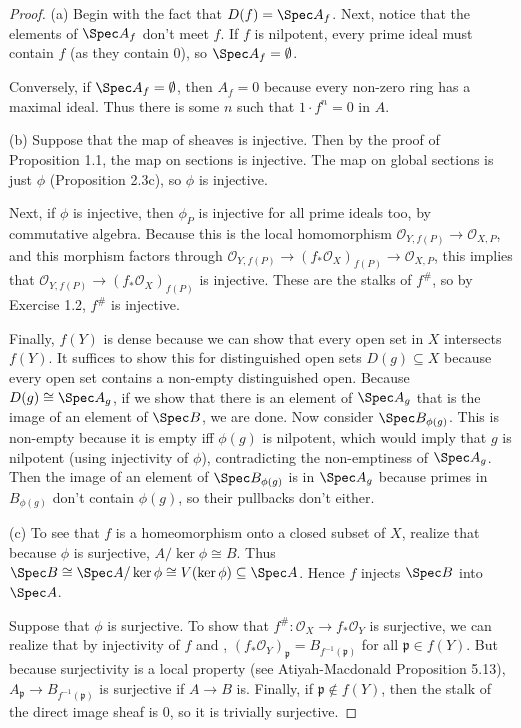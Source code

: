 \begin{proof}
	(a) Begin with the fact that $D(f) = \Spec A_f $.
	Next, notice that the elements of $\Spec A_f $ don't meet $f $.
	If $f $ is nilpotent, every prime ideal must contain $f $ (as they contain $0 $), so $\Spec A_f = \emptyset $.

	Conversely, if $\Spec A_f = \emptyset $, then $A_f = 0$ because every non-zero ring has a maximal ideal.
	Thus there is some $n $ such that $1\cdot f^n = 0 $ in $A $.

	(b) Suppose that the map of sheaves is injective.
	Then by the proof of Proposition 1.1, the map on sections is injective.
	The map on global sections is just $\phi  $ (Proposition 2.3c), so $\phi  $ is injective.

	Next, if $\phi  $ is injective, then $\phi _P $ is injective for all prime ideals too, by commutative algebra.
	Because this is the local homomorphism $\mathcal{O}_{Y,f(P)} \to \mathcal{O}_{X,P} $, and this morphism factors through $\mathcal{O}_{Y,f(P)} \to (f_\ast \mathcal{O}_{X})_{f(P)} \to \mathcal{O}_{X,P}$, this implies that $\mathcal{O}_{Y,f(P)}\to (f_\ast \mathcal{O}_X)_{f(P)} $ is injective.
	These are the stalks of $f^\# $, so by Exercise 1.2, $f^\#$ is injective.

	Finally, $f(Y) $ is dense because we can show that every open set in $X $ intersects $f(Y) $.
	It suffices to show this for distinguished open sets $D(g) \subseteq X $ because every open set contains a non-empty distinguished open.
	Because $D(g) \cong \Spec A_g $, if we show that there is an element of $\Spec A_g $ that is the image of an element of $\Spec B $, we are done.
	Now consider $\Spec B_{\phi (g)} $.
	This is non-empty because it is empty iff $\phi (g) $ is nilpotent, which would imply that $g $ is nilpotent (using injectivity of $\phi  $), contradicting the non-emptiness of $\Spec A_g $.
	Then the image of an element of $\Spec B_{\phi (g)} $ is in $\Spec A_g $ because primes in $B_{\phi (g)} $ don't contain $\phi (g) $, so their pullbacks don't either.

	(c) 
	To see that $f $ is a homeomorphism onto a closed subset of $X $, realize that because $\phi  $ is surjective, $A / \ker \phi \cong B $.
	Thus $\Spec B \cong \Spec A / \ker \phi \cong V(\ker \phi) \subseteq \Spec A$.
	Hence $f $ injects $\Spec B $ into $\Spec A $.

	Suppose that $\phi  $ is surjective.
	To show that $f^\# : \mathcal{O}_{X} \to f_\ast \mathcal{O}_{Y}$ is surjective, we can realize that by injectivity of $f $ and , $(f_\ast \mathcal{O}_{Y})_{\mathfrak{p}} = B_{f^{-1}(\mathfrak{p})}$ for all $\mathfrak{p} \in f(Y) $.
	But because surjectivity is a local property (see Atiyah-Macdonald Proposition 5.13), $A_{\mathfrak{p}}\to B_{f^{-1}(\mathfrak{p})} $ is surjective if $A\to B $ is.
	Finally, if $\mathfrak{p} \notin f(Y) $, then the stalk of the direct image sheaf is 0, so it is trivially surjective.


\end{proof}
